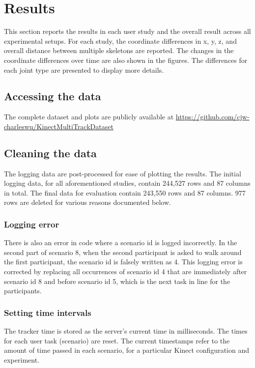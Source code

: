 \section{Results}
\label{sec:results}

This section reports the results in each user study and the overall result across all experimental setups. For each study, the coordinate differences in x, y, z, and overall distance between multiple skeletons are reported. The changes in the coordinate differences over time are also shown in the figures. The differences for each joint type are presented to display more details.

\subsection{Accessing the data}

The complete dataset and plots are publicly available at \url{https://github.com/cjw-charleswu/KinectMultiTrackDataset}

\subsection{Cleaning the data}

The logging data are post-processed for ease of plotting the results. The initial logging data, for all aforementioned studies, contain 244,527 rows and 87 columns in total. The final data for evaluation contain 243,550 rows and 87 columns. 977 rows are deleted for various reasons documented below.

\subsubsection{Logging error}
There is also an error in code where a scenario id is logged incorrectly. In the second part of scenario 8, when the second participant is asked to walk around the first participant, the scenario id is falsely written as 4. This logging error is corrected by replacing all occurrences of scenario id 4 that are immediately after scenario id 8 and before scenario id 5, which is the next task in line for the participants.

\subsubsection{Setting time intervals}
The tracker time is stored as the server's current time in milliseconds. The times for each user task (scenario) are reset. The current timestamps refer to the amount of time passed in each scenario, for a particular Kinect configuration and experiment.

